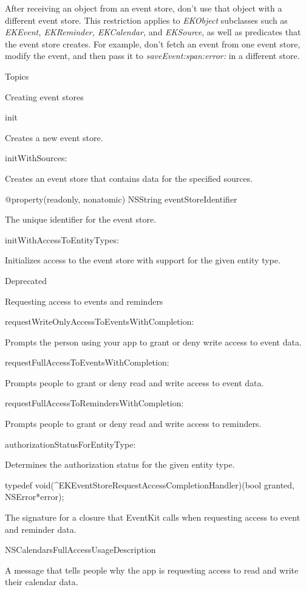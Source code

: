 \documentclass{article}
\begin{document}
After receiving an object from an event store, don't use that object with a different event store. This restriction applies to \textit{EKObject} subclasses such as \textit{EKEvent, EKReminder, EKCalendar,} and \textit{EKSource}, as well as predicates that the event store creates. For example, don't fetch an event from one event store, modify the event, and then pass it to \textit{saveEvent:span:error:} in a different store.

Topics

Creating event stores

\textminus init

Creates a new event store.

\textminus initWithSources:

Creates an event store that contains data for the specified sources.

@property(readonly, nonatomic) NSString \*eventStoreIdentifier

The unique identifier for the event store.

\textminus initWithAccessToEntityTypes:

Initializes access to the event store with support for the given entity type.

Deprecated

Requesting access to events and reminders

\textminus requestWriteOnlyAccessToEventsWithCompletion:

Prompts the person using your app to grant or deny write access to event data.

\textminus requestFullAccessToEventsWithCompletion:

Prompts people to grant or deny read and write access to event data.

\textminus requestFullAccessToRemindersWithCompletion:

Prompts people to grant or deny read and write access to reminders.

\text{+} authorizationStatusForEntityType:

Determines the authorization status for the given entity type.

typedef void(^EKEventStoreRequestAccessCompletionHandler)(bool granted, NSError*error);

The signature for a closure that EventKit calls when requesting access to event and reminder data.

NSCalendarsFullAccessUsageDescription

A message that tells people why the app is requesting access to read and write their calendar data.
\end{document}
